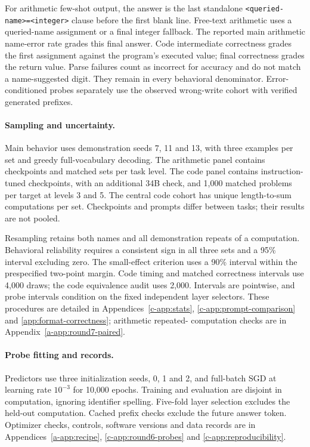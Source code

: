 For arithmetic few-shot output, the answer is the last standalone
\texttt{<queried-name>=<integer>} clause before the first blank line. Free-text
arithmetic uses a queried-name assignment or a final integer fallback. The
reported main arithmetic name-error rate grades this final answer. Code
intermediate correctness grades the first assignment against the program's
executed value; final correctness grades the return value. Parse failures count
as incorrect for accuracy and do not match a name-suggested digit. They remain
in every behavioral denominator. Error-conditioned probes separately use the
observed wrong-write cohort with verified generated prefixes.

\paragraph{Sampling and uncertainty.} Main behavior uses demonstration seeds
7, 11 and 13, with three examples per set and greedy full-vocabulary decoding.
The arithmetic panel contains  checkpoints and
 matched sets per task level. The code panel contains
 instruction-tuned checkpoints, with an additional 34B check,
and 1,000 matched problems per target at levels 3 and 5. The central code cohort
has  unique length-to-sum computations per set. Checkpoints
and prompts differ between tasks; their results are not pooled.

Resampling retains both names and all demonstration repeats of a computation.
Behavioral reliability requires a consistent sign in all three sets and a 95\%
interval excluding zero. The small-effect criterion uses a 90\% interval within
the prespecified two-point margin. Code timing and matched correctness intervals
use 4,000 draws; the code equivalence audit uses 2,000. Intervals are pointwise,
and probe intervals condition on the fixed independent layer selectors. These
procedures are detailed in Appendices~\ref{c-app:stats},
\ref{c-app:prompt-comparison} and \ref{app:format-correctness}; arithmetic repeated-
computation checks are in Appendix~\ref{a-app:round7-paired}.

\paragraph{Probe fitting and records.} Predictors use three initialization seeds,
0, 1 and 2, and full-batch SGD at learning rate $10^{-3}$ for 10,000 epochs.
Training and evaluation are disjoint in computation, ignoring identifier
spelling. Five-fold layer selection excludes the held-out computation. Cached
prefix checks exclude the future answer token. Optimizer checks, controls,
software versions and data records are in Appendices~\ref{a-app:recipe},
\ref{c-app:round6-probes} and \ref{c-app:reproducibility}.
